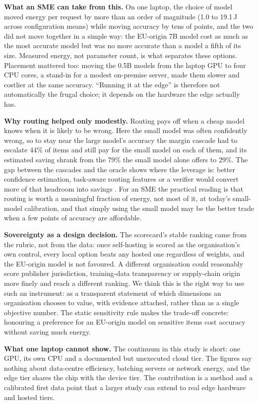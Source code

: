 \textbf{What an SME can take from this.} On one laptop, the choice of model moved energy per request by more than an order of magnitude (1.0 to 19.1\,J across configuration means) while moving accuracy by tens of points, and the two did not move together in a simple way: the EU-origin 7B model cost as much as the most accurate model but was no more accurate than a model a fifth of its size. Measured energy, not parameter count, is what separates these options. Placement mattered too: moving the 0.5B models from the laptop GPU to four CPU cores, a stand-in for a modest on-premise server, made them slower and costlier at the same accuracy. ``Running it at the edge'' is therefore not automatically the frugal choice; it depends on the hardware the edge actually has.

\textbf{Why routing helped only modestly.} Routing pays off when a cheap model knows when it is likely to be wrong. Here the small model was often confidently wrong, so to stay near the large model's accuracy the margin cascade had to escalate 44\% of items and still pay for the small model on each of them, and its estimated saving shrank from the 79\% the small model alone offers to 29\%. The gap between the cascades and the oracle shows where the leverage is: better confidence estimation, task-aware routing features or a verifier would convert more of that headroom into savings \cite{guo2017,kadavath2022,hybridllm}. For an SME the practical reading is that routing is worth a meaningful fraction of energy, not most of it, at today's small-model calibration, and that simply using the small model may be the better trade when a few points of accuracy are affordable.

\textbf{Sovereignty as a design decision.} The scorecard's stable ranking came from the rubric, not from the data: once self-hosting is scored as the organisation's own control, every local option beats any hosted one regardless of weights, and the EU-origin model is not favoured. A different organisation could reasonably score publisher jurisdiction, training-data transparency or supply-chain origin more finely and reach a different ranking. We think this is the right way to use such an instrument: as a transparent statement of which dimensions an organisation chooses to value, with evidence attached, rather than as a single objective number. The static sensitivity rule makes the trade-off concrete: honouring a preference for an EU-origin model on sensitive items cost accuracy without saving much energy.

\textbf{What one laptop cannot show.} The continuum in this study is short: one GPU, its own CPU and a documented but unexecuted cloud tier. The figures say nothing about data-centre efficiency, batching servers or network energy, and the edge tier shares the chip with the device tier. The contribution is a method and a calibrated first data point that a larger study can extend to real edge hardware and hosted tiers.
